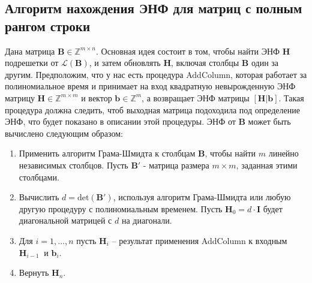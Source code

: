 \begin{algorithmic}

	
	\EndFor
	
\EndFor
\end{algorithmic}

\subsection{Алгоритм нахождения ЭНФ для матриц с полным рангом строки}

Дана матрица $ \mathbf{B} \in \mathbb{Z}^{m \times n} $. Основная идея состоит в том, чтобы найти ЭНФ $ \mathbf{H} $ подрешетки от $ \mathcal{L}(\mathbf{B}) $, и затем обновлять $ \mathbf{H} $, включая столбцы $ \mathbf{B} $ один за другим. Предположим, что у нас есть процедура AddColumn, которая работает за полиномиальное время и принимает на вход квадратную невырожденную ЭНФ матрицу $ \mathbf{H} \in \mathbb{Z}^{m \times m} $ и вектор $ \mathbf{b} \in \mathbb{Z}^{m}$, а возвращает ЭНФ матрицы $ [\mathbf{H|b}] $. Такая процедура должна следить, чтоб выходная матрица подоходила под определение ЭНФ, что будет показано в описании этой процедуры. ЭНФ от $ \mathbf{B} $ может быть вычислено следующим образом:
\begin{enumerate}
\item Применить алгоритм Грама-Шмидта к столбцам $ \mathbf{B} $, чтобы найти $ m $ линейно независимых столбцов. Пусть $ \mathbf{B}' $ - матрица размера $ m \times m $, заданная этими столбцами.
\item Вычислить $ d=\mathrm{det}(\mathbf{B}') $, используя алгоритм Грама-Шмидта или любую другую процедуру с полиномиальным временем. Пусть $ \mathbf{H}_0=d \cdot \mathbf{I} $ будет диагональной матрицей с $ d $ на диагонали.
\item Для $ i=1, \ldots ,n $ пусть $ \mathbf{H}_i $ -- результат применения AddColumn к входным $  \mathbf{H}_{i-1}\ $ и $ \mathbf{b}_i $.
\item Вернуть $ \mathbf{H}_n $.
\end{enumerate}

